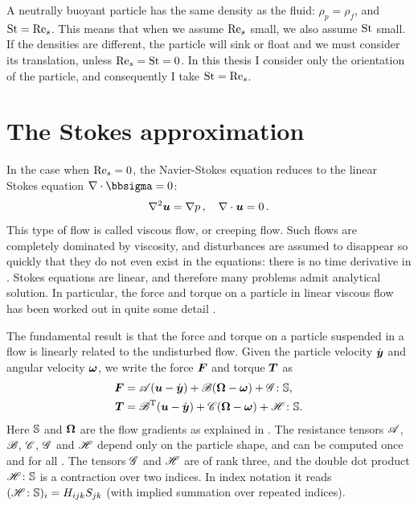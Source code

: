 \documentclass[thesis.tex]{subfiles}
\begin{document}
A neutrally buoyant particle has the same density as the fluid: $\rho_p = \rho_f$, and $\mbox{St} = \textrm{Re}_s$. This means that when we assume $\textrm{Re}_s$ small, we also assume $\mbox{St}$ small. If the densities are different, the particle will sink or float and we must consider its translation, unless $\textrm{Re}_s=\mbox{St}=0$. In this thesis I consider only the orientation of the particle, and consequently I take $\mbox{St} = \textrm{Re}_s$.

\section{The Stokes approximation}\label{sec:stokes}

In the case when $\textrm{Re}_s=0$, the Navier-Stokes equation  reduces to the linear Stokes equation $\nabla \cdot \bbsigma = 0$:
\begin{align}
	\nabla^2 \ve u = \nabla p\,,\quad\nabla\cdot\ve u=0\,.\eqnlab{stokes}
\end{align}
This type of flow is called viscous flow, or creeping flow. Such flows are completely dominated by viscosity, and disturbances are assumed to disappear so quickly that they do not even exist in the equations: there is no time derivative in . Stokes equations are linear, and therefore many problems admit analytical solution. In particular, the force and torque on a particle in linear viscous flow has been worked out in quite some detail \cite{brenner1964,happel1965,brenner1972a,kim1991}. 

The fundamental result is that the force and torque on a particle suspended in a flow is linearly related to the undisturbed flow. Given the particle velocity $\dot{\mbox{\boldmath$y$}}$ and angular velocity $\mbox{\boldmath$\omega$}$, we write the force $\mbox{\boldmath$F$}$ and torque $\mbox{\boldmath$T$}$ as
\begin{align}
	\ve F &= \te A (\ve u - \dot{\ve y}) + \te B (\ve \Omega - \ve \omega) + \te G \dd \ma S, \nn \\
	\ve T &= \te B\transpose (\ve u - \dot{\ve y}) + \te C (\ve \Omega - \ve \omega) + \te H \dd \ma S. \eqnlab{resistanceformulation}
\end{align}
Here $\mathbb{S}$ and $\mbox{\boldmath$\Omega$}$ are the flow gradients as explained in . The resistance tensors $\mathscr{A}$, $\mathscr{B}$, $\mathscr{C}$, $\mathscr{G}$ and $\mathscr{H}$ depend only on the particle shape, and can be computed once and for all \cite{kim1991}. The tensors $\mathscr{G}$ and $\mathscr{H}$ are of rank three, and the double dot product $\mathscr{H} \colon \mathbb{S}$ is a contraction over two indices. In index notation it reads $(\mathscr{H} \colon \mathbb{S})_i = H_{ijk}S_{jk}$ (with implied summation over repeated indices). 
\end{document}

